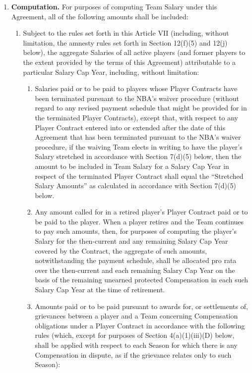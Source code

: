 \documentclass[
]{book}
\providecommand{\tightlist}{%
  \setlength{\itemsep}{0pt}\setlength{\parskip}{0pt}}
\begin{document}
\begin{enumerate}
\def\labelenumi{(\alph{enumi})}
\tightlist
\item
  \textbf{Computation.} For purposes of computing Team Salary under this Agreement, all of the following amounts shall be included:

  \begin{enumerate}
  \def\labelenumii{(\arabic{enumii})}
  \item
    Subject to the rules set forth in this Article VII (including, without limitation, the amnesty rules set forth in Section 12(f)(5) and 12(j) below), the aggregate Salaries of all active players (and former players to the extent provided by the terms of this Agreement) attributable to a particular Salary Cap Year, including, without limitation:

    \begin{enumerate}
    \def\labelenumiii{(\roman{enumiii})}
    \tightlist
    \item
      Salaries paid or to be paid to players whose Player Contracts have been terminated pursuant to the NBA's waiver procedure (without regard to any revised payment schedule that might be provided for in the terminated Player Contracts), except that, with respect to any Player Contract entered into or extended after the date of this Agreement that has been terminated pursuant to the NBA's waiver procedure, if the waiving Team elects in writing to have the player's Salary stretched in accordance with Section 7(d)(5) below, then the amount to be included in Team Salary for a Salary Cap Year in respect of the terminated Player Contract shall equal the ``Stretched Salary Amounts'' as calculated in accordance with Section 7(d)(5) below.
    \item
      Any amount called for in a retired player's Player Contract paid or to be paid to the player. When a player retires and the Team continues to pay such amounts, then, for purposes of computing the player's Salary for the then-current and any remaining Salary Cap Year covered by the Contract, the aggregate of such amounts, notwithstanding the payment schedule, shall be allocated pro rata over the then-current and each remaining Salary Cap Year on the basis of the remaining unearned protected Compensation in each such Salary Cap Year at the time of retirement.
    \item
      Amounts paid or to be paid pursuant to awards for, or settlements of, grievances between a player and a Team concerning Compensation obligations under a Player Contract in accordance with the following rules (which, except for purposes of Section 4(a)(1)(iii)(D) below, shall be applied with respect to each Season for which there is any Compensation in dispute, as if the grievance relates only to such Season):


\end{enumerate}
\end{enumerate}
\end{enumerate}
\end{document}
